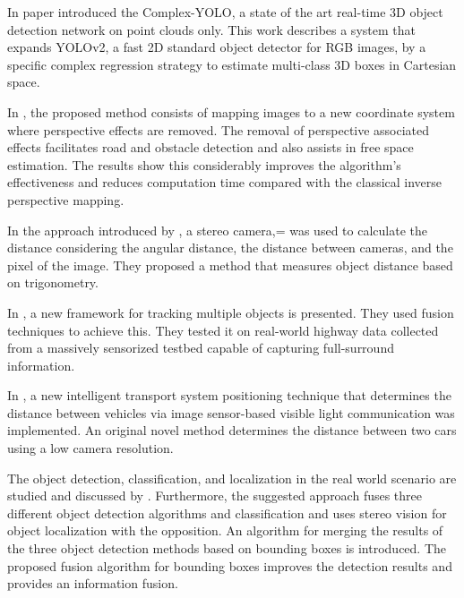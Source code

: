 In paper \cite{Simon2019} introduced the Complex-YOLO, a state of the art real-time 3D object detection network on point clouds only. This work describes a system that expands YOLOv2, a fast 2D standard object detector for RGB images, by a specific complex regression strategy to estimate multi-class 3D boxes in Cartesian space. 

In \cite{Oliveira2015}, the proposed method consists of mapping images to a new coordinate system where perspective effects are removed. The removal of perspective associated effects facilitates road and obstacle detection and also assists in free space estimation. The results show this considerably improves the algorithm's effectiveness and reduces computation time compared with the classical inverse perspective mapping.

In the approach introduced by \cite{Salman2017}, a stereo camera,= was used to calculate the distance considering the angular distance, the distance between cameras, and the pixel of the image. They proposed a method that measures object distance based on trigonometry.   

 In \cite{Rangesh2019}, a new framework for tracking multiple objects is presented. They used fusion techniques to achieve this. They tested it on real-world highway data collected from a massively sensorized testbed capable of capturing full-surround information.

In \cite{Tram2018}, a new intelligent transport system positioning technique that determines the distance between vehicles via image sensor-based visible light communication was implemented. An original novel method determines the distance between two cars using a low camera resolution.

The object detection, classification, and localization in the real world scenario are studied and discussed by \cite{Hofmann2019}. Furthermore, the suggested approach fuses three different object detection algorithms and classification and uses stereo vision for object localization with the opposition. An algorithm for merging the results of the three object detection methods based on bounding boxes is introduced. The proposed fusion algorithm for bounding boxes improves the detection results and provides an information fusion.

